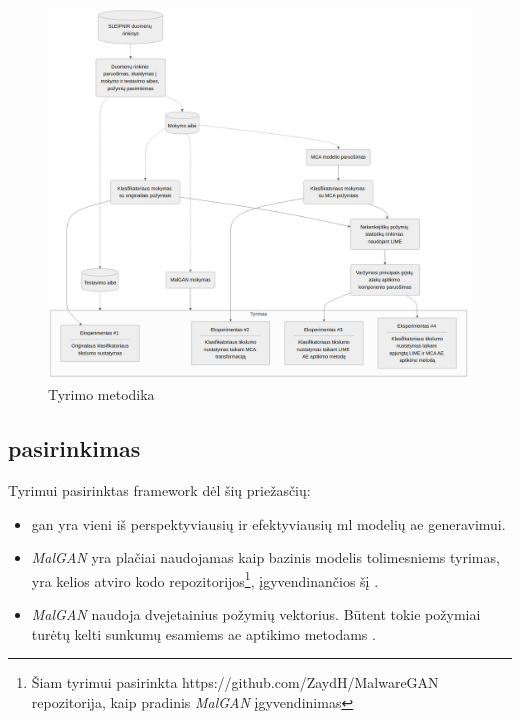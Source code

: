 \begin{figure}[h]
    \centering
    \includegraphics[width=\textwidth]{images/methodology.png}
    \caption{Tyrimo metodika}
    \label{fig:methodology}
\end{figure}

\subsection{  pasirinkimas}\label{sec:method:malgan}

Tyrimui pasirinktas  \gls{framework} dėl šių priežasčių:
\begin{itemize}
    \item \gls{gan} yra vieni iš perspektyviausių ir efektyviausių \gls{ml} modelių \gls{ae} generavimui.
    \item \textit{MalGAN} yra plačiai naudojamas kaip bazinis modelis tolimesniems tyrimas, yra kelios atviro kodo repozitorijos\footnote{Šiam tyrimui pasirinkta https://github.com/ZaydH/MalwareGAN repozitorija, kaip pradinis \textit{MalGAN} įgyvendinimas}, įgyvendinančios šį .
    \item \textit{MalGAN} naudoja dvejetainius požymių vektorius. Būtent tokie požymiai turėtų kelti sunkumų esamiems \gls{ae} aptikimo metodams .
\end{itemize}

\clearpage
